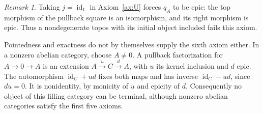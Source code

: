\documentclass[11pt,a4paper]{article}
\theoremstyle{plain}
\theoremstyle{definition}
\theoremstyle{remark}
\newtheorem{remark}[theorem]{Remark}
\newcommand{\id}{\operatorname{id}}
\begin{document}
\begin{remark}\label{concl:initial-and-abelian-obstructions}
Taking $j=\id_1$ in Axiom~\ref{ax:U} forces $q_A$ to be
epic: the top morphism of the pullback square is an isomorphism,
and its right morphism is epic. Thus a nondegenerate topos with
its initial object included fails this axiom.

Pointedness and exactness do not by themselves supply the sixth
axiom either. In a nonzero abelian category, choose $A\ne0$.
A pullback factorization for $A\to0\to A$ is an extension
$A\xrightarrow{u}C\xrightarrow{d}A$, with $u$ its kernel
inclusion and $d$ epic. The automorphism $\id_C+ud$ fixes
both maps and has inverse $\id_C-ud$, since $du=0$.
It is nonidentity, by monicity of $u$ and epicity of $d$.
Consequently no object of this filling category can be terminal,
although nonzero abelian categories satisfy the first five axioms.
\end{remark}
\end{document}
